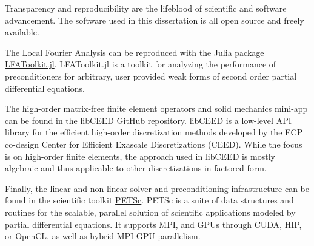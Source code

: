 Transparency and reproducibility are the lifeblood of scientific and software advancement.
The software used in this dissertation is all open source and freely available.

The Local Fourier Analysis can be reproduced with the Julia package \href{https://www.github.com/jeremylt/LFAToolkit.jl}{LFAToolkit.jl}.
LFAToolkit.jl is a toolkit for analyzing the performance of preconditioners for arbitrary, user provided weak forms of second order partial differential equations.

The high-order matrix-free finite element operators and solid mechanics mini-app can be found in the \href{https://www.github.com/CEED/libCEED}{libCEED} GitHub repository.
libCEED is a low-level API library for the efficient high-order discretization methods developed by the ECP co-design Center for Efficient Exascale Discretizations (CEED).
While the focus is on high-order finite elements, the approach used in libCEED is mostly algebraic and thus applicable to other discretizations in factored form.

Finally, the linear and non-linear solver and preconditioning infrastructure can be found in the scientific toolkit \href{https://www.mcs.anl.gov/petsc/}{PETSc}.
PETSc is a suite of data structures and routines for the scalable, parallel solution of scientific applications modeled by partial differential equations.
It supports MPI, and GPUs through CUDA, HIP, or OpenCL, as well as hybrid MPI-GPU parallelism.
